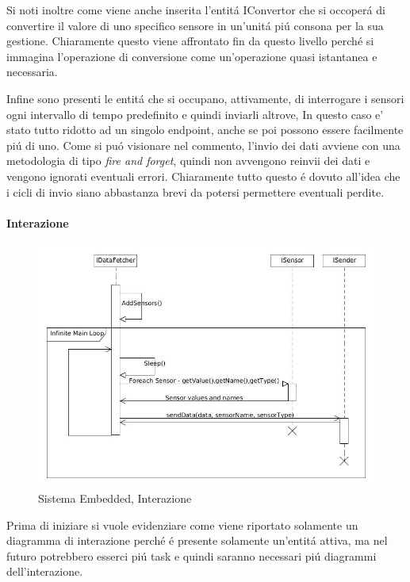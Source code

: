 Si noti inoltre come viene anche inserita l'entit\'a IConvertor che si occoper\'a di convertire il valore di uno specifico sensore in un'unit\'a pi\'u consona per la sua gestione. Chiaramente questo viene affrontato fin da questo livello perch\'e si immagina l'operazione di conversione come un'operazione quasi istantanea e necessaria.

Infine sono presenti le entit\'a che si occupano, attivamente, di interrogare i sensori ogni intervallo di tempo predefinito e quindi inviarli altrove, In questo caso e' stato tutto ridotto ad un singolo endpoint, anche se poi possono essere facilmente pi\'u di uno. Come si pu\'o visionare nel commento, l'invio dei dati avviene con una metodologia di tipo \textit{fire and forget}, quindi non avvengono reinvii dei dati e vengono ignorati eventuali errori. Chiaramente tutto questo \'e dovuto all'idea che i cicli di invio siano abbastanza brevi da potersi permettere eventuali perdite.

\paragraph{Interazione}

\begin{figure}[ht]
\centering
\includegraphics[width=\textwidth]{Figures/DomainModel/EmbeddedSystem/Interaction.jpg}
\caption{Sistema Embedded, Interazione}
\end{figure}

Prima di iniziare si vuole evidenziare come viene riportato solamente un diagramma di interazione perch\'e \'e presente solamente un'entit\'a attiva, ma nel futuro potrebbero esserci pi\'u task e quindi saranno necessari pi\'u diagrammi dell'interazione.

